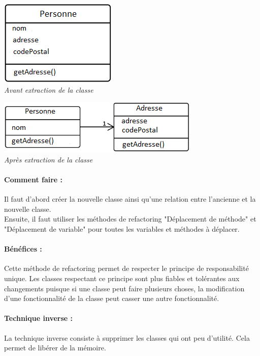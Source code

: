 \documentclass[a4paper,twoside,12pt,openright]{report}
\begin{document}
\begin{center}
\includegraphics[scale=1]{Image/Extraction_Classe.png}\\
\itshape{Avant extraction de la classe}
\end{center}

\begin{center}
\includegraphics[scale=1]{Image/Extraction_Classe2.png}\\
\itshape{Après extraction de la classe}
\end{center}

\paragraph{Comment faire :}
Il faut d'abord créer la nouvelle classe ainsi qu'une relation entre l'ancienne et la nouvelle classe.\\
Ensuite, il faut utiliser les méthodes de refactoring "Déplacement de méthode" et "Déplacement de variable" pour toutes les variables et méthodes à déplacer.

\paragraph{Bénéfices :}
Cette méthode de refactoring permet de respecter le principe de responsabilité unique.
Les classes respectant ce principe sont plus fiables et tolérantes aux changements puisque si une classe peut faire plusieurs choses, la modification d'une fonctionnalité de la classe peut casser une autre fonctionnalité.

\paragraph{Technique inverse :}
La technique inverse consiste à supprimer les classes qui ont peu d'utilité. Cela permet de libérer de la mémoire.\\
\end{document}
